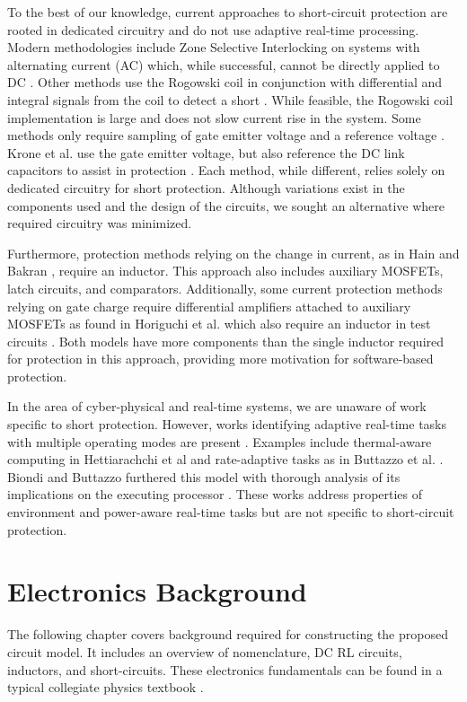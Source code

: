 \documentclass[11pt,oneside]{report}
\begin{document}
    To the best of our knowledge, current approaches to short-circuit protection are rooted in dedicated circuitry and do not use adaptive real-time processing. Modern methodologies include Zone Selective Interlocking on systems with alternating current (AC) which, while successful, cannot be directly applied to DC \cite{scd}. Other methods use the Rogowski coil in conjunction with differential and integral signals from the coil to detect a short \cite{rogowskiCoil}. While feasible, the Rogowski coil implementation is large and does not slow current rise in the system. Some methods only require sampling of gate emitter voltage and a reference voltage \cite{gateChargeChara}. Krone et al. use the gate emitter voltage, but also reference the DC link capacitors to assist in protection \cite{fastAndEasilyImplementable}. Each method, while different, relies solely on dedicated circuitry for short protection. Although variations exist in the components used and the design of the circuits, we sought an alternative where required circuitry was minimized.
    
    Furthermore, protection methods relying on the change in current, as in Hain and Bakran \cite{ultraFastSCD}, require an inductor. This approach also includes auxiliary MOSFETs, latch circuits, and comparators. Additionally, some current protection methods relying on gate charge require differential amplifiers attached to auxiliary MOSFETs as found in Horiguchi et al. which also require an inductor in test circuits \cite{hiSpeedProtection}. Both models have more components than the single inductor required for protection in this approach, providing more motivation for software-based protection.
    
    In the area of cyber-physical and real-time systems, we are unaware of work specific to short protection. However, works identifying adaptive real-time tasks with multiple operating modes are present \cite{modeChangeSystems}. Examples include thermal-aware computing in Hettiarachchi et al \cite{thermalAware} and rate-adaptive tasks as in Buttazzo et al. \cite{rateAdaptive}. Biondi and Buttazzo furthered this model with thorough analysis of its implications on the executing processor \cite{engineCtrl}. These works address properties of environment and power-aware real-time tasks but are not specific to short-circuit protection.
    
    \chapter{Electronics Background}\label{chap:electronics background}
    The following chapter covers background required for constructing the proposed circuit model. It includes an overview of nomenclature, DC RL circuits, inductors, and short-circuits. These electronics fundamentals can be found in a typical collegiate physics textbook \cite{uniphy}.
    
\end{document}
